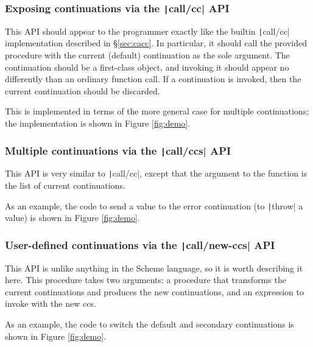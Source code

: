 \documentclass[]{article}
\begin{document}
\subsubsection{Exposing continuations via the \texttt|call/cc| API}
\label{sec:imcc}

This API should appear to the programmer exactly like the builtin \texttt|call/cc| implementation described in \S{\ref{sec:cacc}}. In particular, it should call the provided procedure with the current (default) continuation as the sole argument. The continuation should be a first-class object, and invoking it should appear no differently than an ordinary function call. If a continuation is invoked, then the current continuation should be discarded.

This is implemented in terms of the more general case for multiple continuations; the implementation is shown in Figure \ref{fig:demo}.

\subsubsection{Multiple continuations via the \texttt|call/ccs| API}
\label{sec:iccs}

This API is very similar to \texttt|call/cc|, except that the argument to the function is the list of current continuations.

As an example, the code to send a value to the error continuation (to \texttt|throw| a value) is shown in Figure \ref{fig:demo}.

\subsubsection{User-defined continuations via the \texttt|call/new-ccs| API}
\label{sec:icnc}

This API is unlike anything in the Scheme language, so it is worth describing it here. This procedure takes two arguments: a procedure that transforms the current continuations and produces the new continuations, and an expression to invoke with the new ccs.

As an example, the code to switch the default and secondary continuations is shown in Figure \ref{fig:demo}.
\end{document}
